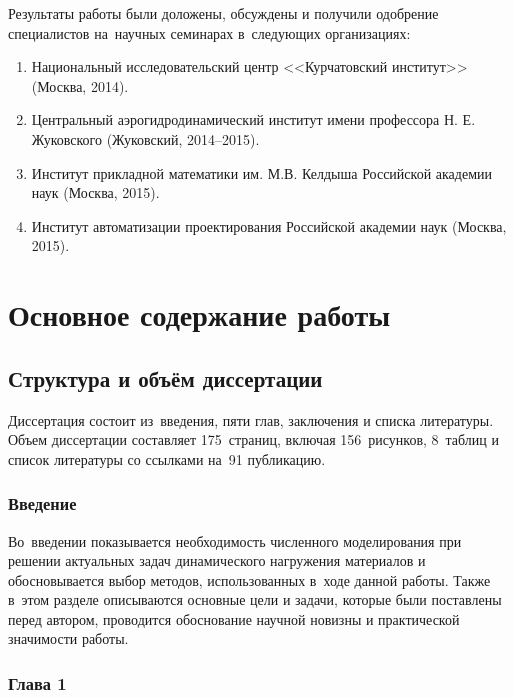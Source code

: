 \documentclass[a4paper,14pt]{extarticle}
\numberwithin{equation}{section}
\begin{document}
    Результаты работы были доложены, обсуждены и получили одобрение специалистов на~научных семинарах в~следующих
    организациях:

    \begin{enumerate}
        \item Национальный исследовательский центр <<Курчатовский институт>> (Москва, 2014).
        \item Центральный аэрогидродинамический институт имени профессора
              Н. Е. Жуковского (Жуковский, 2014--2015).
        \item Институт прикладной математики им. М.В. Келдыша Российской академии наук (Москва, 2015).
        \item Институт автоматизации проектирования Российской академии наук (Москва, 2015).
    \end{enumerate}


    \section*{Основное содержание работы}
    \subsection*{Структура и объём диссертации}

    Диссертация состоит из~введения, пяти глав, заключения и списка литературы. Объем диссертации
    составляет 175~страниц, включая 156~рисунков, 8~таблиц и список литературы со ссылками на~91
    публикацию.

        \subsubsection*{Введение}

        Во~введении показывается необходимость численного моделирования при решении актуальных задач динамического
        нагружения материалов и обосновывается выбор методов, использованных в~ходе данной работы. Также в~этом разделе
        описываются основные цели и задачи, которые были поставлены перед автором, проводится обоснование научной
        новизны и практической значимости работы.

        \subsubsection*{Глава 1}
\end{document}

